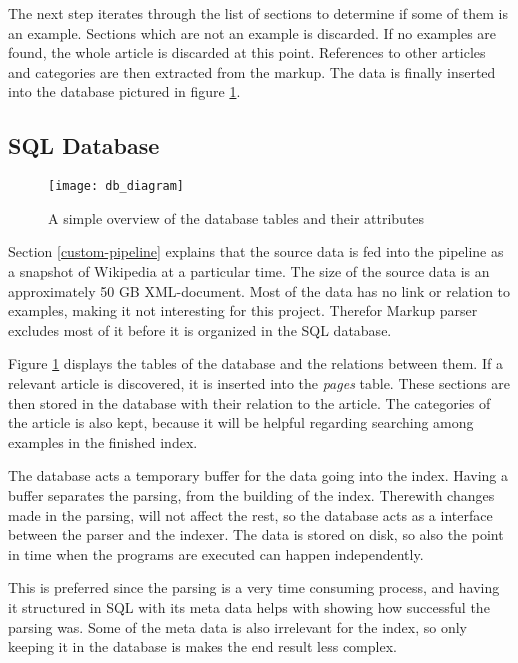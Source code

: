 The next step iterates through the list of sections to determine if some of them is an example. Sections which are not an example is discarded. If no examples are found, the whole article is discarded at this point. References to other articles and categories are then extracted from the markup. The data is finally inserted into the database pictured in figure \ref{fig:db_diagram}.



\subsection{SQL Database}

\begin{figure}[h] 
\caption{A simple overview of the database tables and their attributes}
\texttt{[image: db\_diagram]}
\label{fig:db_diagram}
\end{figure}


Section \ref{custom-pipeline} explains that the source data is fed into the pipeline as a snapshot of Wikipedia at a particular time. The size of the source data is an approximately 50 GB XML-document. Most of the data has no link or relation to examples, making it not interesting for this project. Therefor Markup parser excludes most of it before it is organized in the SQL database. 

Figure \ref{fig:db_diagram} displays the tables of the database and the relations between them. If a relevant article is discovered, it is inserted into the \textit{pages} table. These sections are then stored in the database with their relation to the article. The categories of the article is also kept, because it will be helpful regarding searching among examples in the finished index.  

The database acts a temporary buffer for the data going into the index. Having a buffer separates the parsing, from the building of the index. Therewith changes made in the parsing, will not affect the rest, so the database acts as a interface between the parser and the indexer. The data is stored on disk, so also the point in time when the programs are executed can happen independently.

This is preferred since the parsing is a very time consuming process, and having it structured in SQL with its meta data helps with showing how successful the parsing was. Some of the meta data is also irrelevant for the index, so only keeping it in the database is makes the end result less complex.


